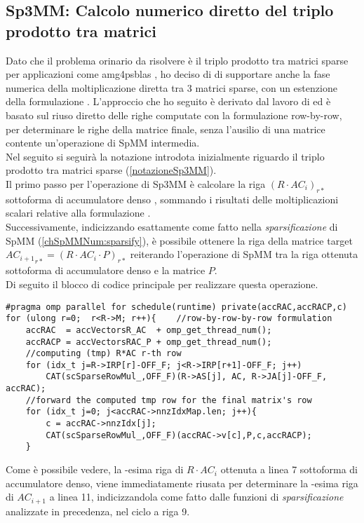 \subsection{Sp3MM: Calcolo numerico diretto del triplo prodotto tra matrici} \label{chSpMMNum:directProduct}
Dato che il problema orinario da risolvere è il triplo prodotto tra matrici sparse per applicazioni come 
amg4psblas \cite{AMG4PSBLAS}, ho deciso di di supportare anche 
la fase numerica della moltiplicazione diretta tra 3 matrici sparse, con un estenzione della formulazione \rowbyrow.
\voidLine
L'approccio che ho seguito è derivato dal lavoro di \cite{Sp3MM4AMG} 
ed è basato sul riuso diretto delle righe computate con la formulazione row-by-row,
per determinare le righe della matrice finale, senza l'ausilio di una matrice contente un'operazione di SpMM intermedia.\\ 
Nel seguito si seguirà la notazione introdota inizialmente riguardo il triplo prodotto tra matrici sparse (\ref{notazioneSp3MM}).\\
Il primo passo per l'operazione di Sp3MM è calcolare la riga $\left( R \cdot AC_i \right)_{r*}$ 
sottoforma di accumulatore denso , sommando i risultati delle moltiplicazioni scalari relative alla formulazione \rowbyrow.\\
Successivamente, indicizzando  esattamente come fatto nella \emph{sparsificazione} di SpMM (\ref{chSpMMNum:sparsify}),
è possibile ottenere la riga della matrice target ${AC_{i+1}}_{r*} = \left(R\cdot AC_i\cdot P\right)_{r*}$ 
reiterando l'operazione di SpMM tra la riga ottenuta sottoforma di accumulatore denso e la matrice $P$.\\
Di seguito il blocco di codice principale per realizzare questa operazione.\\
\begin{lstlisting}
#pragma omp parallel for schedule(runtime) private(accRAC,accRACP,c)
for (ulong r=0;  r<R->M; r++){    //row-by-row-by-row formulation
    accRAC  = accVectorsR_AC  + omp_get_thread_num();
    accRACP = accVectorsRAC_P + omp_get_thread_num();
    //computing (tmp) R*AC r-th row
    for (idx_t j=R->IRP[r]-OFF_F; j<R->IRP[r+1]-OFF_F; j++)
        CAT(scSparseRowMul_,OFF_F)(R->AS[j], AC, R->JA[j]-OFF_F, accRAC);
    //forward the computed tmp row for the final matrix's row
    for (idx_t j=0; j<accRAC->nnzIdxMap.len; j++){
        c = accRAC->nnzIdx[j];    
        CAT(scSparseRowMul_,OFF_F)(accRAC->v[c],P,c,accRACP);
    }
\end{lstlisting}
Come è possibile vedere, la -esima riga di $R\cdot AC_i$ ottenuta a linea 7 sottoforma di accumulatore denso,
viene immediatamente riusata per determinare la -esima riga di $AC_{i+1}$ a linea 11,
indicizzandola come fatto dalle funzioni di \emph{sparsificazione} analizzate in precedenza,
nel ciclo a riga 9.\\
